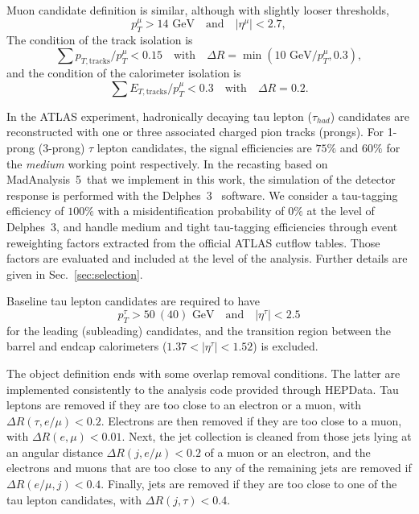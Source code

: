 \documentclass{ws-mpla}
\newcommand{\madanalysis}{{\sc MadAnalysis~5}}
\begin{document}
Muon candidate definition is similar, although with slightly looser thresholds,
\begin{equation}
p^{\mu}_T > 14 \textrm{ GeV}\quad \textrm{and}\quad |\eta^{\mu}| < 2.7,
\end{equation}
The condition of the track isolation is 
\begin{equation}
\sum p_{T,\textrm{tracks}}/p^{\mu}_T < 0.15\quad \textrm{with}\quad \Delta R=\min(10\textrm{ GeV}/p^{\mu}_T,0.3),
\end{equation}
and the condition of the calorimeter isolation is
\begin{equation}
\sum E_{T,\textrm{tracks}}/p^{\mu}_T < 0.3\quad \textrm{with}\quad \Delta R=0.2.
\end{equation}

In the ATLAS experiment, hadronically decaying tau lepton ($\tau_{had}$) candidates are reconstructed with one or three associated charged pion tracks (prongs).
For 1-prong (3-prong) $\tau$ lepton candidates, the signal efficiencies are $75\%$ and $60\%$ for the \textit{medium} working point respectively.
In the recasting based on \madanalysis\ that we implement in this work, the simulation of the detector response is performed with the {\sc Delphes}~3~\cite{deFavereau:2013fsa} software. We consider a tau-tagging efficiency of $100\%$ with a misidentification probability of $0\%$ at the level of {\sc Delphes}~3, and handle medium and tight tau-tagging efficiencies through event reweighting factors extracted from the official ATLAS cutflow tables. Those factors are evaluated and included at the level of the analysis. Further details are given in Sec.~\ref{sec:selection}.

Baseline tau lepton candidates are required to have 
\begin{equation}
p^{\tau}_T > 50\ (40) \textrm{ GeV}\quad \textrm{and}\quad |\eta^{\tau}| < 2.5
\end{equation}
for the leading (subleading) candidates, and the transition region between the barrel and endcap calorimeters ($ 1.37 < |\eta^{\tau}| < 1.52 $) is excluded.

The object definition ends with some overlap removal conditions. The latter are implemented consistently to the analysis code provided through HEPData\cite{hepdata}.
Tau leptons are removed if they are too close to an electron or a muon, with $\Delta R(\tau,e/\mu) < 0.2$. Electrons are then removed if they are too close to a muon, with $\Delta R(e,\mu) < 0.01$. Next, the jet collection is cleaned from those jets lying at an angular distance $\Delta R(j,e/\mu) < 0.2$ of a muon or an electron, and the electrons and muons that are too close to any of the remaining jets are removed if $\Delta R(e/\mu,j) < 0.4$. Finally, jets are removed if they are too close to one of the tau lepton candidates, with $\Delta R(j,\tau) < 0.4$.
\end{document}
